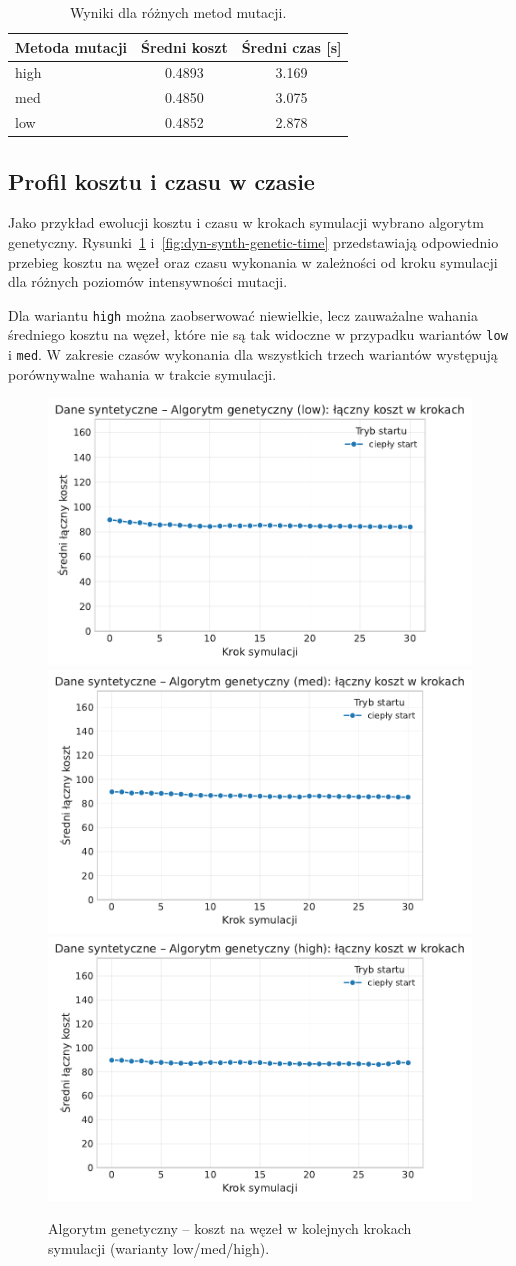 \begin{table}[H]
  \centering
  \caption{Wyniki dla różnych metod mutacji.}
  \label{tab:dyn-synth-warm}
  \begin{tabular}{lcc}
    \toprule
    \textbf{Metoda mutacji} & \textbf{Średni koszt} & \textbf{Średni czas [s]} \\
    \midrule
    high                    & 0.4893                & 3.169                    \\
    med                     & 0.4850                & 3.075                    \\
    low                     & 0.4852                & 2.878                    \\
    \bottomrule
  \end{tabular}
\end{table}

\subsection{Profil kosztu i czasu w czasie}
Jako przykład ewolucji kosztu i czasu w krokach symulacji wybrano algorytm genetyczny. Rysunki~\ref{fig:dyn-synth-genetic-cost} i~\ref{fig:dyn-synth-genetic-time} przedstawiają odpowiednio przebieg kosztu na węzeł oraz czasu wykonania w zależności od kroku symulacji dla różnych poziomów intensywności mutacji.

Dla wariantu \texttt{high} można zaobserwować niewielkie, lecz zauważalne wahania średniego kosztu na węzeł, które nie są tak widoczne w przypadku wariantów \texttt{low} i \texttt{med}. W zakresie czasów wykonania dla wszystkich trzech wariantów występują porównywalne wahania w trakcie symulacji.

\begin{figure}[H]
  \centering
  \includegraphics[width=0.32\linewidth]{assets/figures/dynamic/synthetic/synthetic_algorytm_genetyczny_cost_over_steps_low.pdf}
  \includegraphics[width=0.32\linewidth]{assets/figures/dynamic/synthetic/synthetic_algorytm_genetyczny_cost_over_steps_med.pdf}
  \includegraphics[width=0.32\linewidth]{assets/figures/dynamic/synthetic/synthetic_algorytm_genetyczny_cost_over_steps_high.pdf}
  \caption{Algorytm genetyczny -- koszt na węzeł w kolejnych krokach symulacji (warianty low/med/high).}
  \label{fig:dyn-synth-genetic-cost}
\end{figure}

